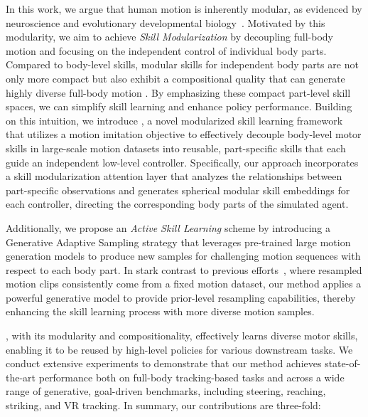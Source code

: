 In this work, we argue that human motion is inherently modular, as evidenced by neuroscience and evolutionary developmental biology~\cite{sylos2022complexity, kitano2002computational,hintze2008evolution,callebaut2005modularity}. Motivated by this modularity, we aim to achieve \textit{Skill Modularization} by decoupling full-body motion and focusing on the independent control of individual body parts. 
Compared to body-level skills, modular skills for independent body parts are not only more compact but also exhibit a compositional quality that can generate highly diverse full-body motion \cite{Jang_2022, 10.1145/3550454.3555489}. By emphasizing these compact part-level skill spaces, we can simplify skill learning and enhance policy performance. Building on this intuition,  we introduce \name, a novel modularized skill learning framework that utilizes a motion imitation objective to effectively decouple body-level motor skills in large-scale motion datasets \cite{AMASS:ICCV:2019} into reusable, part-specific skills that each guide an independent low-level controller. Specifically, our approach incorporates a skill modularization attention layer that analyzes the relationships between part-specific observations and generates spherical modular skill embeddings for each controller, directing the corresponding body parts of the simulated agent. 

Additionally, we propose an \textit{Active Skill Learning} scheme by introducing a Generative Adaptive Sampling strategy that leverages pre-trained large motion generation models \cite{tevet2023human} to produce new samples for challenging motion sequences with respect to each body part. In stark contrast to previous efforts~\cite{dou2022case, Luo2023PerpetualHC}, where resampled motion clips consistently come from a fixed motion dataset, our method applies a powerful generative model to provide prior-level resampling capabilities, thereby enhancing the skill learning process with more diverse motion samples. 

\name, with its modularity and compositionality, effectively learns diverse motor skills, enabling it to be reused by high-level policies for various downstream tasks. We conduct extensive experiments to demonstrate that our method achieves state-of-the-art performance both on full-body tracking-based tasks and across a wide range of generative, goal-driven benchmarks, including steering, reaching, striking, and VR tracking. In summary, our contributions are three-fold:

